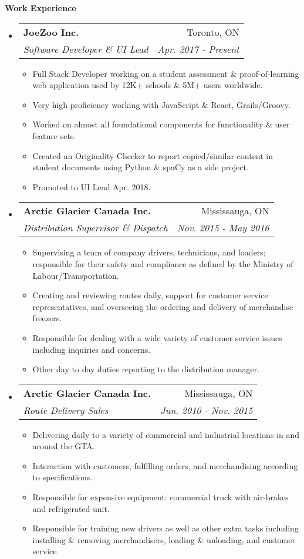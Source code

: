 \documentclass[letterpaper,11pt]{article}
\makeatletter
\newcommand{\resitem}[1]{\item #1 \vspace{-2pt}}
\newcommand{\ressubheading}[4]{
\begin{tabular*}{6.5in}{l@{\extracolsep{\fill}}r}
		\textbf{#1} & #2 \\
		\textit{#3} & \textit{#4} \\
\end{tabular*}\vspace{-6pt}}
\makeatother
\begin{document}
\begin{mdframed}[backgroundcolor=light-gray]
\textbf{Work Experience}
\end{mdframed}
\begin{itemize}
\item
	\ressubheading{JoeZoo Inc.}{Toronto, ON}{Software Developer \& UI Lead}{Apr. 2017 - Present}
	\begin{itemize}
		\resitem{Full Stack Developer working on a student assessment \& proof-of-learning web application used by 12K+ schools \& 5M+ users worldwide.}
		\resitem{Very high proficiency working with JavaScript \& React, Grails/Groovy.}
		\resitem{Worked on almost all foundational components for functionality \& user feature sets.}
		\resitem{Created an Originality Checker to report copied/similar content in student documents using Python \& spaCy as a side project.}
		\resitem{Promoted to UI Lead Apr. 2018.}
	\end{itemize}
\item
	\ressubheading{Arctic Glacier Canada Inc.}{Mississauga, ON}{Distribution Supervisor \& Dispatch}{Nov. 2015 - May 2016}
	\begin{itemize}
		\resitem{Supervising a team of company drivers, technicians, and loaders; responsible for their safety and compliance as defined by the Ministry of Labour/Transportation.}
		\resitem{Creating and reviewing routes daily, support for customer service representatives, and overseeing the ordering and delivery of merchandise freezers.}
		\resitem{Responsible for dealing with a wide variety of customer service issues including inquiries and concerns.}
		\resitem{Other day to day duties reporting to the distribution manager.}
	\end{itemize}
\item
	\ressubheading{Arctic Glacier Canada Inc.}{Mississauga, ON}{Route Delivery Sales}{Jun. 2010 - Nov. 2015}
	\begin{itemize}
		\resitem{Delivering daily to a variety of commercial and industrial locations in and around the GTA.}
		\resitem{Interaction with customers, fulfilling orders, and merchandising according to specifications.}
		\resitem{Responsible for expensive equipment: commercial truck with air-brakes and refrigerated unit.}
		\resitem{Responsible for training new drivers as well as other extra tasks including installing \& removing merchandisers, loading \& unloading, and customer service.}
	\end{itemize}
\end{itemize}
\end{document}

